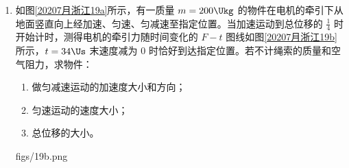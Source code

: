 \documentclass[\gkver]{gaokaozhenti}
\begin{document}
\begin{enumerate}
{（2）一节干电池的电动势一般约为 $1.5\UV$，故电压表量程选择 $0\sim3\UV$，电流表量程选择 $0\sim0.6\UA$，所以两表的读数分别为 $1.30\UV$（$1.29\sim1.31\UV$ 均可），$0.40\UA$（$0.39\sim0.41\UA$ 均可）。

（3）由闭合电路欧姆定律可得 $U=E-Ir$，可得 $U-I$ 图象的纵轴截距为电源电动势，斜率为电源内阻。图甲中电流表外接，则实验测得的电源内阻 $r_{\text{测}}=r_{\text{内}}+r_{A}$，测量值偏大；图乙中电路 $r_{\text{测}}=\frac{r_{V}}{r_{\text{内}}+r_{V}}r_{\text{内}}$，测量值偏小，但是由于 $R_{V}\gg r_{\text{真}}$，故图乙实验测出的内阻误差更小，故图线Ⅰ对应图乙，图线Ⅱ对应的图甲。

（4）图线Ⅱ与纵轴的交点为电源的电动势 $E=1.52\UV$；在图线Ⅰ与横轴的交点为短路电流 $I=2.86\UA$。由 $r=\frac{E}{I}=\frac{1.52\UV}{2.86\UA}=0.53\UO$，此实验原理无误差。
}

\item
如图\ref{20207月浙江19a}所示，有一质量 $m=200\Ukg$ 的物件在电机的牵引下从地面竖直向上经加速、匀速、匀减速至指定位置。当加速运动到总位移的 $\frac{1}{4}$ 时开始计时，测得电机的牵引力随时间变化的 $F-t$ 图线如图\ref{20207月浙江19b}所示，$t=34\Us$ 末速度减为 0 时恰好到达指定位置。若不计绳索的质量和空气阻力，求物件：
\begin{enumerate}
	\item
	做匀减速运动的加速度大小和方向；
	\item
	匀速运动的速度大小；
	\item
	总位移的大小。
\end{enumerate}

{figs/19b.png}
\end{enumerate}
\end{document}
